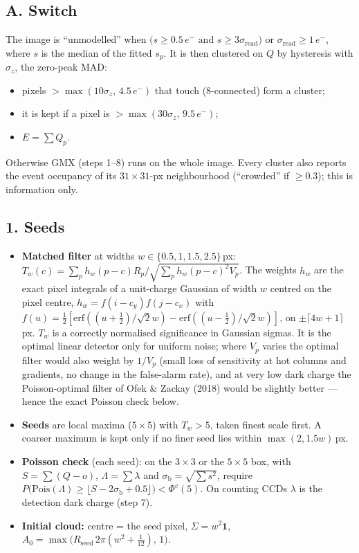 \documentclass[10pt,a4paper]{article}
\newcommand{\el}{\ensuremath{e^-}}
\begin{document}
\subsection*{A. Switch}
The image is ``unmodelled'' when $\big(s\ge0.5\,\el\text{ and }s\ge3\sigma_\mathrm{read}\big)$ or
$\sigma_\mathrm{read}\ge1$\,\el{}, where $s$ is the median of the fitted $s_p$. It is then clustered on $Q$ by
hysteresis with $\sigma_z$, the zero-peak MAD:
\begin{itemize}
\item pixels $>\max(10\sigma_z,\,4.5\,\el)$ that touch (8-connected) form a cluster;
\item it is kept if a pixel is $>\max(30\sigma_z,\,9.5\,\el)$;
\item $E=\sum Q_p$.
\end{itemize}
Otherwise GMX (steps 1--8) runs on the whole image. Every cluster also reports the event occupancy of its
$31\times31$-px neighbourhood (``crowded'' if $\ge0.3$); this is information only.

\subsection*{1. Seeds}
\begin{itemize}
\item \textbf{Matched filter} at widths $w\in\{0.5,1,1.5,2.5\}$\,px:
$T_w(c)=\sum_p h_w(p-c)R_p\big/\sqrt{\sum_p h_w(p-c)^2V_p}$. The weights $h_w$ are the exact pixel integrals of a
unit-charge Gaussian of width $w$ centred on the pixel centre, $h_w=f(i-c_y)f(j-c_x)$ with
$f(u)=\tfrac12[\mathrm{erf}((u+\tfrac12)/\sqrt2w)-\mathrm{erf}((u-\tfrac12)/\sqrt2w)]$, on $\pm\lceil4w+1\rceil$\,px. $T_w$ is a
correctly normalised significance in Gaussian sigmas. It is the optimal linear detector only for uniform noise; where $V_p$ varies
the optimal filter would also weight by $1/V_p$ (small loss of sensitivity at hot columns and gradients, no change in the
false-alarm rate), and at very low dark charge the Poisson-optimal filter of Ofek \& Zackay (2018) would be slightly better ---
hence the exact Poisson check below.
\item \textbf{Seeds} are local maxima ($5\times5$) with $T_w>5$, taken finest scale first. A coarser maximum is kept
only if no finer seed lies within $\max(2,1.5w)$\,px.
\item \textbf{Poisson check} (each seed): on the $3\times3$ or the $5\times5$ box, with $S=\sum(Q-o)$,
$\Lambda=\sum\lambda$ and $\sigma_\mathrm{b}=\sqrt{\sum s^2}$, require
$P\big(\mathrm{Pois}(\Lambda)\ge\lfloor S-2\sigma_\mathrm{b}+0.5\rfloor\big)<\Phi^c(5)$. On counting CCDs $\lambda$ is
the detection dark charge (step 7).
\item \textbf{Initial cloud:} centre = the seed pixel, $\Sigma=w^2\mathbf 1$,
$A_0=\max\!\big(R_\mathrm{seed}\,2\pi(w^2+\tfrac1{12}),\,1\big)$.
\end{itemize}
\end{document}
